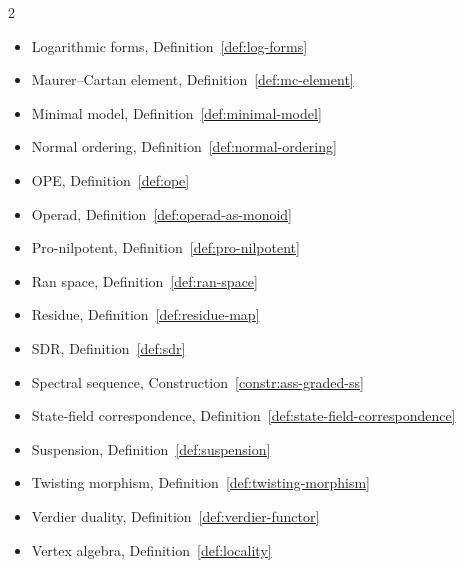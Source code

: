 \begin{multicols}{2}
\begin{itemize}[leftmargin=*, itemsep=0pt]
\item Logarithmic forms, Definition~\ref{def:log-forms}
\item Maurer--Cartan element, Definition~\ref{def:mc-element}
\item Minimal model, Definition~\ref{def:minimal-model}
\item Normal ordering, Definition~\ref{def:normal-ordering}
\item OPE, Definition~\ref{def:ope}
\item Operad, Definition~\ref{def:operad-as-monoid}
\item Pro-nilpotent, Definition~\ref{def:pro-nilpotent}
\item Ran space, Definition~\ref{def:ran-space}
\item Residue, Definition~\ref{def:residue-map}
\item SDR, Definition~\ref{def:sdr}
\item Spectral sequence, Construction~\ref{constr:ass-graded-ss}
\item State-field correspondence, Definition~\ref{def:state-field-correspondence}
\item Suspension, Definition~\ref{def:suspension}
\item Twisting morphism, Definition~\ref{def:twisting-morphism}
\item Verdier duality, Definition~\ref{def:verdier-functor}
\item Vertex algebra, Definition~\ref{def:locality}
\end{itemize}
\end{multicols}
